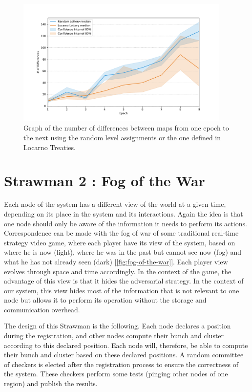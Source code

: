\documentclass[a4paper,11pt,twoside,openright]{report}
\begin{document}
\begin{figure}[!h] \centering
  \includegraphics[width=300pt]{figures/LocarnoTreaties-differences}
  \caption{Graph of the number of differences between maps from one epoch to
  the next using the random level assignments or the one defined in Locarno
  Treaties. } \label{fig:LocarnoTreaties-differences} \end{figure}

\section{Strawman 2 : Fog of the War} \label{sec:Fog-of-the-war}

Each node of the system has a different view of the world at a given time, depending on its place in the system and its interactions. Again the idea is
that one node should only be aware of the information it needs to perform its
actions. Correspondence can be made with the fog of war of some traditional
real-time strategy video game, where each player have its view of the
system, based on where he is now (light), where he was in the past but cannot
see now (fog) and what he has not already seen (dark)
[\autoref{fig:fog-of-the-war}]. Each player view evolves through space and
time accordingly. In the context of the game, the advantage of this view is
that it hides the adversarial strategy. In the context of our system, this view
hides most of the information that is not relevant to one node but allows it
to perform its operation without the storage and communication overhead. 

The design of this Strawman is the following. Each node declares a
position during the registration, and other nodes compute their bunch and
cluster according to this declared position. Each node will, therefore, be able
to compute their bunch and cluster based on these declared positions. A random committee of checkers is elected after
the registration process to ensure
the correctness of the system. These checkers perform some tests (pinging other
nodes of one region) and publish the results. 
\end{document}
